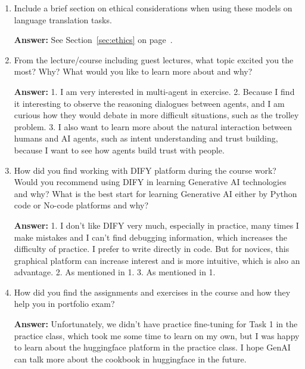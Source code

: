 \begin{enumerate}
    \item   Include a brief section on ethical considerations when using these models on language translation tasks.
    
    \textbf{Answer:}
    See Section~\ref{sec:ethics} on page~\pageref{sec:ethics}.

    \item   From the lecture/course including guest lectures, what topic excited you the most?
            Why?
            What would you like to learn more about and why?
    
    \textbf{Answer:}
    1. I am very interested in multi-agent in exercise.
    2. Because I find it interesting to observe the reasoning dialogues between agents, 
    and I am curious how they would debate in more difficult situations, such as the trolley problem.
    3. I also want to learn more about the natural interaction between humans and AI agents, 
    such as intent understanding and trust building, because I want to see how agents build trust with people.


    \item   How did you find working with DIFY platform during the course work?
            Would you recommend using DIFY in learning Generative AI technologies and why?
            What is the best start for learning Generative AI either by Python code or No-code platforms and why?
    
    \textbf{Answer:}
    1. I don't like DIFY very much, especially in practice, many times I make mistakes and I can't find debugging information, 
    which increases the difficulty of practice. I prefer to write directly in code. 
    But for novices, this graphical platform can increase interest and is more intuitive, which is also an advantage.
    2. As mentioned in 1.
    3. As mentioned in 1.

    \item   How did you find the assignments and exercises in the course and how they help you in portfolio exam?
    
    \textbf{Answer:}
    Unfortunately, we didn't have practice fine-tuning for Task 1 in the practice class, 
    which took me some time to learn on my own, but I was happy to learn about the huggingface platform in the practice class. 
    I hope GenAI can talk more about the cookbook in huggingface in the future.
    
\end{enumerate}
